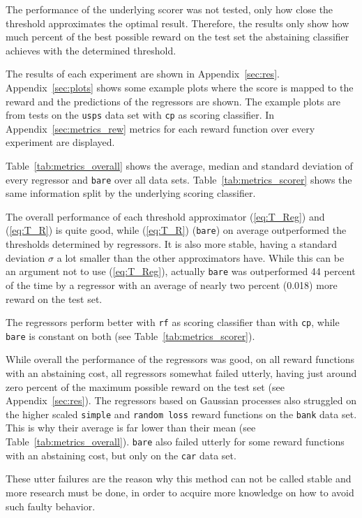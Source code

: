 \documentclass[twoside,11pt]{article}
\begin{document}
The performance of the underlying scorer was not tested,
only how close the threshold approximates the optimal
result. Therefore, the results only show how much percent
of the best possible reward on the test set the abstaining
classifier achieves with the determined threshold.

The results of each experiment are shown in
Appendix~\ref{sec:res}.
Appendix~\ref{sec:plots} shows some example plots where the
score is mapped to the reward and the predictions of the
regressors are shown.
The example plots are from tests on the \texttt{usps} data
set with \texttt{cp} as scoring classifier.
In Appendix~\ref{sec:metrics_rew} metrics for each reward
function over every experiment are displayed.

Table~\ref{tab:metrics_overall} shows the average, median
and standard deviation of every regressor and \texttt{bare}
over all data sets.
Table~\ref{tab:metrics_scorer} shows the same information
split by the underlying scoring classifier.

The overall performance of each threshold approximator
(\ref{eq:T_Reg}) and (\ref{eq:T_R}) is quite good,
while (\ref{eq:T_R}) (\texttt{bare}) on average
outperformed the thresholds determined by regressors.
It is also more stable, having a standard deviation
$\sigma$ a lot smaller than the other approximators have.
While this can be an argument not to use (\ref{eq:T_Reg}),
actually \texttt{bare} was outperformed 44 percent of the
time by a regressor with an average of nearly two percent
(0.018) more reward on the test set.

The regressors perform better with \texttt{rf} as scoring
classifier than with \texttt{cp}, while \texttt{bare} is
constant on both (see Table~\ref{tab:metrics_scorer}).

While overall the performance of the regressors was
good, on all reward functions with an abstaining cost,
all regressors somewhat failed utterly, having just around
zero percent of the maximum possible reward on the test
set (see Appendix~\ref{sec:res}).
The regressors based on Gaussian processes also struggled
on the higher scaled \texttt{simple} and
\texttt{random loss} reward functions on the \texttt{bank}
data set.
This is why their average is far lower than their mean
(see Table~\ref{tab:metrics_overall}).
\texttt{bare} also failed utterly for some reward functions
with an abstaining cost, but only on the \texttt{car} data
set.



These utter failures are the reason why this method can not
be called stable and more research must be done, in
order to acquire more knowledge on how to avoid such faulty
behavior.
\end{document}

